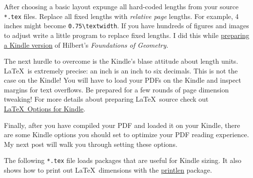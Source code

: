 After choosing a basic layout expunge all hard-coded lengths from your
source \texttt{*.tex} files. Replace all fixed lengths with \emph{relative page}
lengths. For example, 4 inches might become \verb|0.75\textwidth|. If
you have hundreds of figures and images to adjust write a little program
to replace fixed lengths. I did this while
\href{http://bakerjd99.wordpress.com/2011/07/12/open-source-hilbert-for-the-kindle/}{preparing
a Kindle version} of Hilbert's \emph{Foundations of Geometry.}

The next hurdle to overcome is the Kindle's blase attitude about length
units. \LaTeX\ is extremely precise: an inch is an inch to six
decimals. This is not the case on the Kindle! You will have to load your
PDFs on the Kindle and inspect margins for text overflows. Be prepared
for a few rounds of page dimension tweaking! For more details about
preparing \LaTeX\ source check out
\href{http://www.faqoverflow.com/tex/16735.html}{\LaTeX\ Options for
Kindle}.

Finally, after you have compiled your PDF and loaded it on your Kindle,
there are some Kindle options you should set to optimize your PDF
reading experience. My next post will walk you through setting these
options.

The following \texttt{*.tex} file loads packages that are useful for Kindle
sizing. It also shows how to print out \LaTeX\ dimensions with the
\href{http://www.ctan.org/pkg/printlen}{printlen} package.

